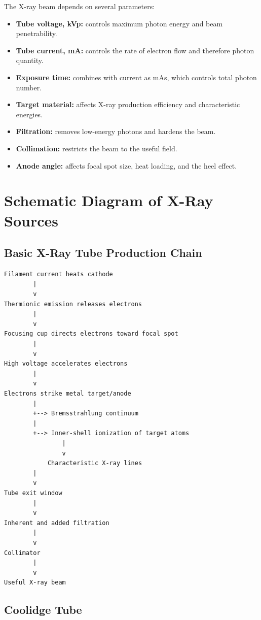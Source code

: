 \documentclass[12pt]{article}
\begin{document}
The X-ray beam depends on several parameters:
\begin{itemize}
    \item \textbf{Tube voltage, kVp:} controls maximum photon energy and beam penetrability.
    \item \textbf{Tube current, mA:} controls the rate of electron flow and therefore photon quantity.
    \item \textbf{Exposure time:} combines with current as mAs, which controls total photon number.
    \item \textbf{Target material:} affects X-ray production efficiency and characteristic energies.
    \item \textbf{Filtration:} removes low-energy photons and hardens the beam.
    \item \textbf{Collimation:} restricts the beam to the useful field.
    \item \textbf{Anode angle:} affects focal spot size, heat loading, and the heel effect.
\end{itemize}

\section{Schematic Diagram of X-Ray Sources}

\subsection{Basic X-Ray Tube Production Chain}

\begin{lstlisting}
Filament current heats cathode
        |
        v
Thermionic emission releases electrons
        |
        v
Focusing cup directs electrons toward focal spot
        |
        v
High voltage accelerates electrons
        |
        v
Electrons strike metal target/anode
        |
        +--> Bremsstrahlung continuum
        |
        +--> Inner-shell ionization of target atoms
                |
                v
            Characteristic X-ray lines
        |
        v
Tube exit window
        |
        v
Inherent and added filtration
        |
        v
Collimator
        |
        v
Useful X-ray beam
\end{lstlisting}

\subsection{Coolidge Tube}
\end{document}
